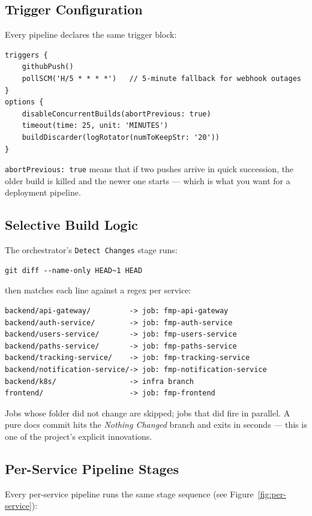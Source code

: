 \documentclass[11pt,a4paper]{article}
\begin{document}
\subsection{Trigger Configuration}
Every pipeline declares the same trigger block:

\begin{lstlisting}[caption={Trigger configuration used by all pipelines.}]
triggers {
    githubPush()
    pollSCM('H/5 * * * *')   // 5-minute fallback for webhook outages
}
options {
    disableConcurrentBuilds(abortPrevious: true)
    timeout(time: 25, unit: 'MINUTES')
    buildDiscarder(logRotator(numToKeepStr: '20'))
}
\end{lstlisting}

\texttt{abortPrevious: true} means that if two pushes arrive in quick
succession, the older build is killed and the newer one starts —
which is what you want for a deployment pipeline.

\subsection{Selective Build Logic}
The orchestrator's \texttt{Detect Changes} stage runs:

\begin{lstlisting}
git diff --name-only HEAD~1 HEAD
\end{lstlisting}

then matches each line against a regex per service:

\begin{lstlisting}
backend/api-gateway/         -> job: fmp-api-gateway
backend/auth-service/        -> job: fmp-auth-service
backend/users-service/       -> job: fmp-users-service
backend/paths-service/       -> job: fmp-paths-service
backend/tracking-service/    -> job: fmp-tracking-service
backend/notification-service/-> job: fmp-notification-service
backend/k8s/                 -> infra branch
frontend/                    -> job: fmp-frontend
\end{lstlisting}

Jobs whose folder did not change are skipped; jobs that did fire in
parallel.  A pure docs commit hits the \emph{Nothing Changed} branch
and exits in seconds — this is one of the project's explicit
innovations.

\subsection{Per-Service Pipeline Stages}
Every per-service pipeline runs the same stage sequence (see
Figure~\ref{fig:per-service}):
\end{document}
